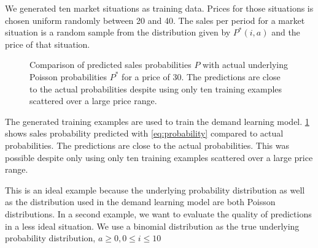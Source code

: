 We generated ten market situations as training data.
Prices for those situations is chosen uniform randomly between 20 and 40.
The sales per period for a market situation is a random sample from the distribution given by $P^*(i, a)$ and the price of that situation.

\begin{figure}[t]
	\caption[Comparison of Predicted Probabilites with Underlying Poisson Probabilities]{Comparison of predicted sales probabilities $P$ with actual underlying Poisson probabilities $P^*$ for a price of 30. The predictions are close to the actual probabilities despite using only ten training examples scattered over a large price range.}
	\label{fig:probs_poisson}
\end{figure}

The generated training examples are used to train the demand learning model.
\cref{fig:probs_poisson} shows sales probability predicted with \cref{eq:probability} compared to actual probabilities.
The predictions are close to the actual probabilities.
This was possible despite only using only ten training examples scattered over a large price range.

This is an ideal example because the underlying probability distribution as well as the distribution used in the demand learning model are both Poisson distributions.
In a second example, we want to evaluate the quality of predictions in a less ideal situation.
We use a binomial distribution as the true underlying probability distribution, $a \geq 0, 0 \leq i \leq 10$

